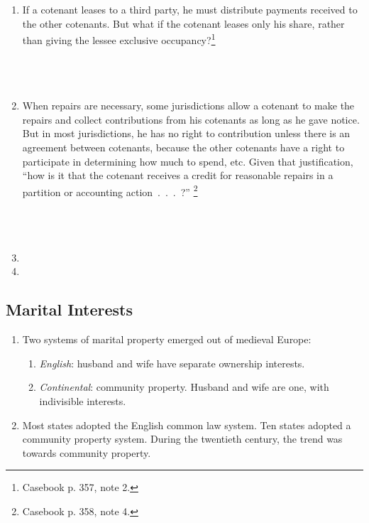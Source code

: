 \begin{enumerate}
    \item If a cotenant leases to a third party, he must distribute payments 
    received to the other cotenants. But what if the cotenant leases only 
    his share, rather than giving the lessee exclusive 
    occupancy?\footnote{Casebook p. 357, note 2.}
    ~\\\\\\\\ %
    \item When repairs are necessary, some jurisdictions allow a cotenant to 
    make the repairs and collect contributions from his cotenants as long as 
    he gave notice. But in most jurisdictions, he has no right to contribution 
    unless there is an agreement between cotenants, because the other 
    cotenants have a right to participate in determining how much to spend, 
    etc. Given that justification, ``how is it that the cotenant receives a 
    credit for reasonable repairs in a partition or accounting 
    action~.~.~.~?'' \footnote{Casebook p. 358, note 4.}
    ~\\\\\\\\ %
    \item  %
    \item %

\end{enumerate}

\subsection{Marital Interests}

\begin{enumerate}
    \item Two systems of marital property emerged out of medieval Europe:
    \begin{enumerate}
        \item \emph{English}: husband and wife have separate ownership 
        interests.
        \item \emph{Continental}: community property. Husband and wife are 
        one, with indivisible interests.
    \end{enumerate}
    \item Most states adopted the English common law system. Ten states 
    adopted a community property system. During the twentieth century, the 
    trend was towards community property.
\end{enumerate}

